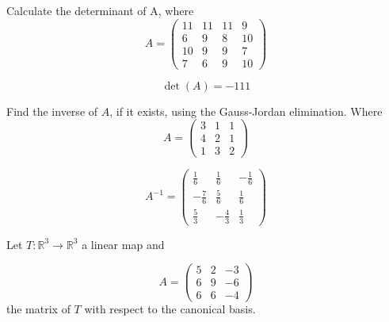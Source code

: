 \begin{questions}

\question Calculate the determinant of A, where
$$
A=\left(\begin{array}{rrrr}
11 & 11 & 11 & 9 \\
6 & 9 & 8 & 10 \\
10 & 9 & 9 & 7 \\
7 & 6 & 9 & 10
\end{array}\right)
$$

\begin{solution}
$$\det(A)=-111$$
\end{solution}

\question Find the inverse of $A$, if it exists, using the Gauss-Jordan elimination. Where
$$
A=\left(\begin{array}{rrr}
3 & 1 & 1 \\
4 & 2 & 1 \\
1 & 3 & 2
\end{array}\right)
$$

\begin{solution}
$$A^{-1}=\left(\begin{array}{rrr}
\frac{1}{6} & \frac{1}{6} & -\frac{1}{6} \\
-\frac{7}{6} & \frac{5}{6} & \frac{1}{6} \\
\frac{5}{3} & -\frac{4}{3} & \frac{1}{3}
\end{array}\right)$$
\end{solution}

\question Let $T:\mathbb{R}^3\rightarrow\mathbb{R}^3$  a linear map and
 
$$
A=\left(\begin{array}{rrr}
5 & 2 & -3 \\
6 & 9 & -6 \\
6 & 6 & -4
\end{array}\right)
$$
the matrix of $T$ with respect to the canonical basis.
\end{questions}
